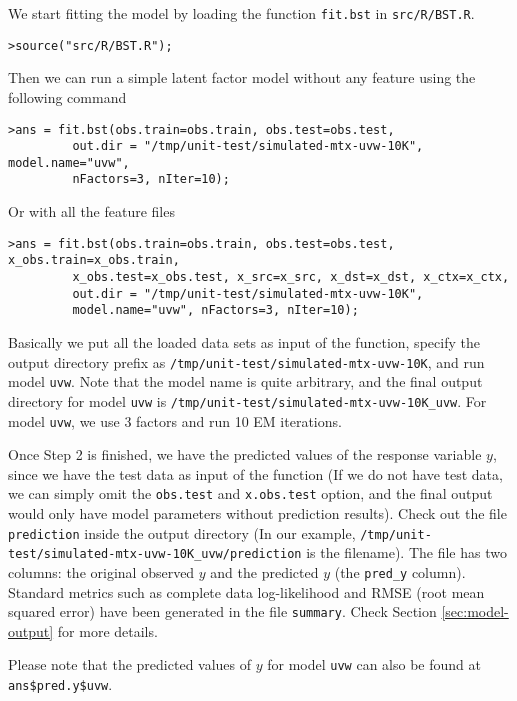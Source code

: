 We start fitting the model by loading the function {\tt fit.bst} in {\tt src/R/BST.R}. 
{\small\begin{verbatim}
>source("src/R/BST.R");
\end{verbatim}}
Then we can run a simple latent factor model without any feature using the following command
{\small\begin{verbatim}
>ans = fit.bst(obs.train=obs.train, obs.test=obs.test, 
		 out.dir = "/tmp/unit-test/simulated-mtx-uvw-10K", model.name="uvw", 
		 nFactors=3, nIter=10);
\end{verbatim}}
Or with all the feature files
{\small\begin{verbatim}
>ans = fit.bst(obs.train=obs.train, obs.test=obs.test, x_obs.train=x_obs.train, 
		 x_obs.test=x_obs.test, x_src=x_src, x_dst=x_dst, x_ctx=x_ctx,
		 out.dir = "/tmp/unit-test/simulated-mtx-uvw-10K", 
		 model.name="uvw", nFactors=3, nIter=10);
\end{verbatim}}
Basically we put all the loaded data sets as input of the function, specify the output directory prefix as {\tt /tmp/unit-test/simulated-mtx-uvw-10K}, and run model {\tt uvw}. Note that the model name is quite arbitrary, and the final output directory for model {\tt uvw} is {\tt /tmp/unit-test/simulated-mtx-uvw-10K\_uvw}. For model {\tt uvw}, we use 3 factors and run 10 EM iterations. 

Once Step 2 is finished, we have the predicted values of the response variable $y$, since we have the test data as input of the function (If we do not have test data, we can simply omit the {\tt obs.test} and {\tt x.obs.test} option, and the final output would only have model parameters without prediction results).  Check out the file {\tt prediction} inside the output directory (In our example, {\tt /tmp/unit-test/simulated-mtx-uvw-10K\_uvw/prediction} is the filename). The file has two columns: the original observed $y$ and the predicted $y$ (the {\tt pred\_y} column). Standard metrics such as complete data log-likelihood and RMSE (root mean squared error) have been generated in the file {\tt summary}. Check Section \ref{sec:model-output} for more details.

Please note that the predicted values of $y$ for model {\tt uvw} can also be found at {\tt ans\$pred.y\$uvw}.

